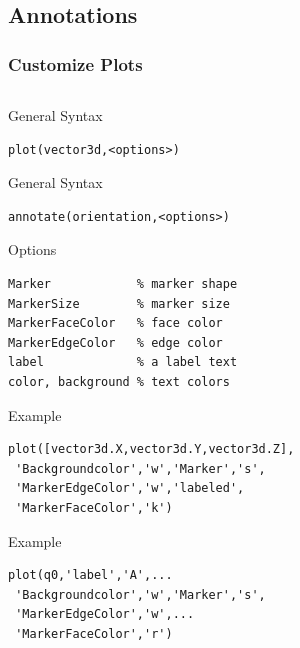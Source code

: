 \documentclass[compress]{beamer}
\begin{document}
\subsection*{Annotations}

\begin{frame}[fragile]
  \frametitle{Customize Plots}

\begin{columns}
  \begin{column}{8.5cm}

\begin{overprint}
  General Syntax%
\begin{lstlisting}[style=input]
plot(vector3d,<options>)
\end{lstlisting}
  General Syntax
\begin{lstlisting}[style=input]
annotate(orientation,<options>)
\end{lstlisting}
\end{overprint}

Options
\begin{lstlisting}[style=input]
Marker            % marker shape
MarkerSize        % marker size
MarkerFaceColor   % face color
MarkerEdgeColor   % edge color
label             % a label text
color, background % text colors
\end{lstlisting}

\begin{overprint}
  Example
\begin{lstlisting}[style=input]
plot([vector3d.X,vector3d.Y,vector3d.Z],
 'Backgroundcolor','w','Marker','s',
 'MarkerEdgeColor','w','labeled',
 'MarkerFaceColor','k')
\end{lstlisting}

Example
\begin{lstlisting}[style=input]
plot(q0,'label','A',...
 'Backgroundcolor','w','Marker','s',
 'MarkerEdgeColor','w',...
 'MarkerFaceColor','r')
\end{lstlisting}

\end{overprint}

\end{column}


\end{columns}
\end{frame}
\end{document}
